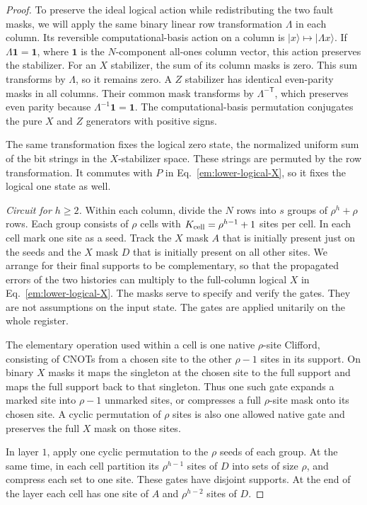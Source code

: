 \documentclass[aps,prl,reprint,notitlepage,nofootinbib,nobibnotes]{revtex4-2}
\begin{document}
\begin{proof}
To preserve the ideal logical action while redistributing the two fault masks, we will apply the
same binary linear row transformation $\Lambda$ in each column. Its reversible computational-basis
action on a column is $|x\rangle\mapsto|\Lambda x\rangle$. If $\Lambda\mathbf 1=\mathbf 1$, where
$\mathbf 1$ is the $N$-component all-ones column vector, this action preserves the stabilizer. For
an $X$ stabilizer, the sum of its column masks is zero. This sum transforms by $\Lambda$, so it
remains zero. A $Z$ stabilizer has identical even-parity masks in all columns. Their common mask
transforms by $\Lambda^{-\mathsf T}$, which preserves even parity because $\Lambda^{-1}\mathbf
1=\mathbf 1$. The computational-basis permutation conjugates the pure $X$ and $Z$ generators with
positive signs.

The same transformation fixes the logical zero state, the normalized uniform sum of the bit strings
in the $X$-stabilizer space. These strings are permuted by the row transformation. It commutes with
$P$ in Eq.~\eqref{em:lower-logical-X}, so it fixes the logical one state as well.

\emph{Circuit for $h\ge2$.}
Within each column, divide the $N$ rows into $s$ groups of $\rho^h+\rho$ rows. Each group consists
of $\rho$ cells with $K_{\rm cell}=\rho^{h-1}+1$ sites per cell. In each cell mark one site as a
seed. Track the $X$ mask $A$ that is initially present just on the seeds and the $X$ mask $D$ that
is initially present on all other sites. We arrange for their final supports to be complementary,
so that the propagated errors of the two histories can multiply to the full-column logical $X$ in
Eq.~\eqref{em:lower-logical-X}. The masks serve to specify and verify the gates. They are not
assumptions on the input state. The gates are applied unitarily on the whole register.

The elementary operation used within a cell is one native $\rho$-site Clifford, consisting of CNOTs
from a chosen site to the other $\rho-1$ sites in its support. On binary $X$ masks it maps the
singleton at the chosen site to the full support and maps the full support back to that singleton.
Thus one such gate expands a marked site into $\rho-1$ unmarked sites, or compresses a full
$\rho$-site mask onto its chosen site. A cyclic permutation of $\rho$ sites is also one allowed
native gate and preserves the full $X$ mask on those sites.

In layer $1$, apply one cyclic permutation to the $\rho$ seeds of each group. At the same time, in
each cell partition its $\rho^{h-1}$ sites of $D$ into sets of size $\rho$, and compress each set
to one site. These gates have disjoint supports. At the end of the layer each cell has one site of
$A$ and $\rho^{h-2}$ sites of $D$.


\end{proof}
\end{document}
